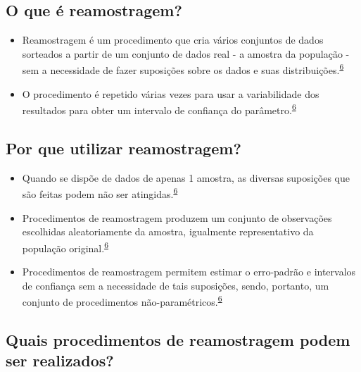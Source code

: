 \documentclass[
  a4paper,
]{book}
\begin{document}
\hypertarget{o-que-uxe9-reamostragem}{%
\subsection{O que é reamostragem?}\label{o-que-uxe9-reamostragem}}

\begin{itemize}
\item
  Reamostragem é um procedimento que cria vários conjuntos de dados sorteados a partir de um conjunto de dados real - a amostra da população - sem a necessidade de fazer suposições sobre os dados e suas distribuições.\textsuperscript{\protect\hyperlink{ref-Bland2015}{6}}
\item
  O procedimento é repetido várias vezes para usar a variabilidade dos resultados para obter um intervalo de confiança do parâmetro.\textsuperscript{\protect\hyperlink{ref-Bland2015}{6}}
\end{itemize}

\hypertarget{por-que-utilizar-reamostragem}{%
\subsection{Por que utilizar reamostragem?}\label{por-que-utilizar-reamostragem}}

\begin{itemize}
\item
  Quando se dispõe de dados de apenas 1 amostra, as diversas suposições que são feitas podem não ser atingidas.\textsuperscript{\protect\hyperlink{ref-Bland2015}{6}}
\item
  Procedimentos de reamostragem produzem um conjunto de observações escolhidas aleatoriamente da amostra, igualmente representativo da população original.\textsuperscript{\protect\hyperlink{ref-Bland2015}{6}}
\item
  Procedimentos de reamostragem permitem estimar o erro-padrão e intervalos de confiança sem a necessidade de tais suposições, sendo, portanto, um conjunto de procedimentos não-paramétricos.\textsuperscript{\protect\hyperlink{ref-Bland2015}{6}}
\end{itemize}

\hypertarget{quais-procedimentos-de-reamostragem-podem-ser-realizados}{%
\subsection{Quais procedimentos de reamostragem podem ser realizados?}\label{quais-procedimentos-de-reamostragem-podem-ser-realizados}}
\end{document}
